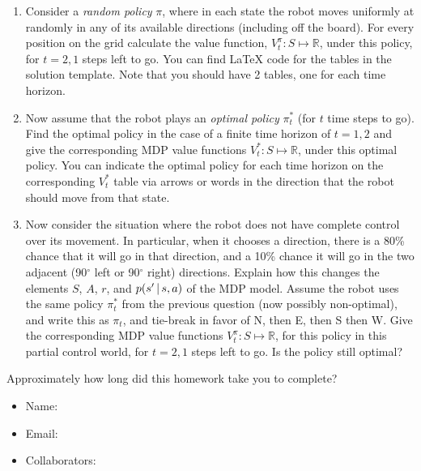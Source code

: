 \documentclass[submit]{harvardml}
\begin{document}
\begin{problem}
\begin{enumerate}
    \item Consider a \emph{random policy} $\pi$, where
in each state the robot moves uniformly at randomly in any of its available directions (including off the board). 
      For every position on the grid calculate the
value function, $V^\pi_t: S\mapsto 
\mathbb{R}$, under this policy, for $t=2, 1$ steps left
to go. You can find LaTeX code for the tables in the solution template. Note that you should have 2 tables, one for each time horizon. 
%
    \item Now assume that the robot plays an \emph{optimal policy}
      $\pi^\ast_t$ (for $t$ time steps to go). Find the optimal policy in the case of a finite time horizon of $t = 1, 2$ and give the corresponding 
MDP value functions $V^\ast_t: S\mapsto 
\mathbb{R}$, under this
optimal policy. You can indicate the optimal policy for each time horizon on the corresponding $V^\ast_t$ table via arrows or words in the direction that the robot should move from that state. 
    \item Now consider the situation where the robot does not have
      complete control over its movement. In particular, 
when it chooses a direction, there is a 80\% chance that it will go in
      that direction, and a 10\% chance it will go in the two adjacent
      (90$^\circ$ left or 90$^\circ$ right) 
directions. Explain how this changes the elements $S$, $A$, $r$, and $p(s' \,|\, s,a)$ of the MDP model. 
Assume the robot uses the same
 policy $\pi^\ast_t$ from the previous question (now possibly
      non-optimal), and write this as $\pi_t$, and tie-break in favor of N, then E, then S then W.
Give the corresponding 
MDP value functions $V^\pi_t: S\mapsto 
\mathbb{R}$, for this policy in this partial control world, for $t=2, 1$ steps left
to go. Is the policy still optimal?
  \end{enumerate}
\end{problem}


\newpage
\begin{problem}[Calibration, 1pt]
Approximately how long did this homework take you to complete?
\end{problem}


\begin{itemize}
    \item Name:
    \item Email:
    \item Collaborators:
\end{itemize}
\end{document}
